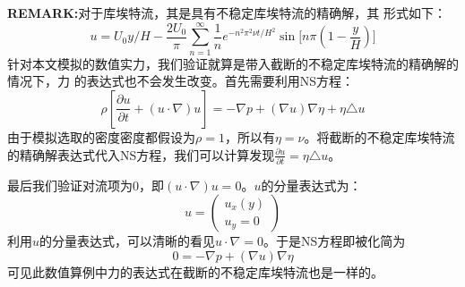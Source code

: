 \documentclass[11pt,UTF8]{ctexart}
\begin{document}
    \par{\textbf{REMARK:}对于库埃特流，其是具有不稳定库埃特流的精确解，其
    形式如下：
    $$
    u=U_0y/H-\frac{2U_0}{\pi}\sum_{n=1}^{\infty}\frac{1}{n}e^{-n^2\pi^2\nu t/H^2}\sin[{n\pi(1-\frac{y}{H})]}
    $$
    针对本文模拟的数值实力，我们验证就算是带入截断的不稳定库埃特流的精确解的情况下，力
    的表达式也不会发生改变。首先需要利用NS方程：
    $$
    \rho[\frac{\partial u}{\partial t}+(u \cdot \nabla)u] = -\nabla p + (\nabla u)
    \nabla \eta + \eta \triangle u
    $$
    由于模拟选取的密度密度都假设为$\rho=1$，所以有$\eta=\nu$。将截断的不稳定库埃特流
    的精确解表达式代入NS方程，我们可以计算发现$\frac{\partial u}{\partial t}=
    \eta \triangle u$。}
    \par{最后我们验证对流项为0，即$(u \cdot \nabla)u=0$。$u$的分量表达式为：
    $$
     u=\left(
    \begin{array}{cc}
        u_x(y) \\
        u_y=0
    \end{array}
    \right)
    $$
    利用$u$的分量表达式，可以清晰的看见$u \cdot \nabla = 0$。于是NS方程即被化简为
    $$
    0 = -\nabla p + (\nabla u)\nabla \eta
    $$可见此数值算例中力的表达式在截断的不稳定库埃特流也是一样的。}
\end{document}
